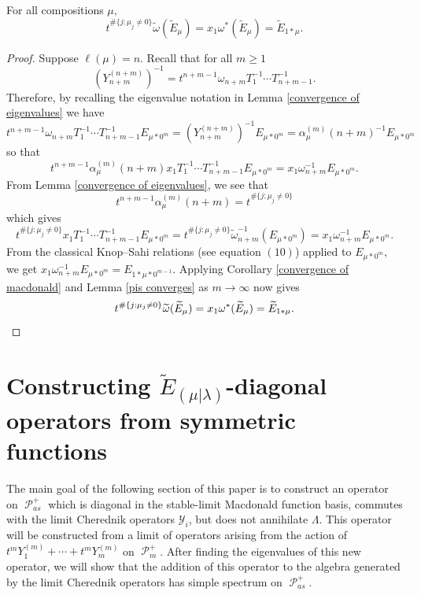 \documentclass[ALCO,Unicode]{cedram}
\newcommand{\y}{{ \mathscr{Y} }}
\DeclareMathOperator{\sP}{\mathscr{P} }
\begin{document}
\begin{prop}
    For all compositions $\mu,$ 
    \begin{equation}
        t^{\#\{j:\mu_j \neq 0\}}\widetilde{\omega}( \widetilde{E}_{\mu}) = x_1 \omega^{*}(\widetilde{E}_{\mu}) = \widetilde{E}_{1*\mu}.
    \end{equation}
\end{prop}
\begin{proof}
    Suppose $\ell(\mu) = n$. Recall that for all $m \geq 1$
    $$(Y^{(n+m)}_{n+m})^{-1} = t^{n+m-1} \omega_{n+m}T_1^{-1}\cdots T_{n+m-1}^{-1}.$$ Therefore, by recalling the eigenvalue notation in Lemma \ref{convergence of eigenvalues} we have 
    $$t^{n+m-1} \omega_{n+m}T_1^{-1}\cdots T_{n+m-1}^{-1}E_{\mu*0^m} = (Y^{(n+m)}_{n+m})^{-1} E_{\mu*0^m} = \alpha_{\mu}^{(m)}(n+m)^{-1}E_{\mu*0^m}$$
    so that 
    $$t^{n+m-1}\alpha_{\mu}^{(m)}(n+m) x_1 T_1^{-1}\cdots T_{n+m-1}^{-1}E_{\mu*0^m} = x_1 \omega_{n+m}^{-1}E_{\mu*0^m}.$$
    From Lemma \ref{convergence of eigenvalues}, we see that 
    $$t^{n+m-1}\alpha_{\mu}^{(m)}(n+m) = t^{\#\{j:\mu_j \neq 0\}}$$
    which gives 
    $$t^{\#\{j:\mu_j \neq 0\}} x_1 T_1^{-1}\cdots T_{n+m-1}^{-1}E_{\mu*0^m} = t^{\#\{j:\mu_j \neq 0\}} \widetilde{\omega}_{n+m}^{-1}(E_{\mu*0^m}) = x_1 \omega_{n+m}^{-1}E_{\mu*0^m}. $$
    From the classical Knop--Sahi relations (see \cite{haglund2007combinatorial} equation $(10)$) applied to $E_{\mu*0^m},$ we get 
    $x_1 \omega_{n+m}^{-1}E_{\mu*0^m} = E_{1*\mu*0^{m-1}}.$
    Applying Corollary \ref{convergence of macdonald} and Lemma \ref{pis converges} as $m \rightarrow \infty$ now gives 
    \[t^{\#\{j:\mu_j \neq 0\}}\widetilde{\omega}(\widetilde{E}_{\mu}) = x_1 \omega^{*}(\widetilde{E}_{\mu}) = \widetilde{E}_{1*\mu}. \qedhere\]
\end{proof}


\section{Constructing \texorpdfstring{$\widetilde{E}_{(\mu|\lambda)}$}{E\_(mu | lambda)}-diagonal operators from symmetric functions}\label{one dim wt spaces section}

The main goal of the following section of this paper is to construct an operator on $\sP_{as}^{+}$ which is diagonal in the stable-limit Macdonald function basis, commutes with the limit Cherednik operators $\y_i$, but does not annihilate $\Lambda$. This operator will be constructed from a limit of operators arising from the action of $t^mY^{(m)}_1+ \cdots +t^m Y^{(m)}_m$ on $\sP_m^{+}$. After finding the eigenvalues of this new operator, we will show that the addition of this operator to the algebra generated by the limit Cherednik operators has simple spectrum on $\sP_{as}^{+}$.
\end{document}
